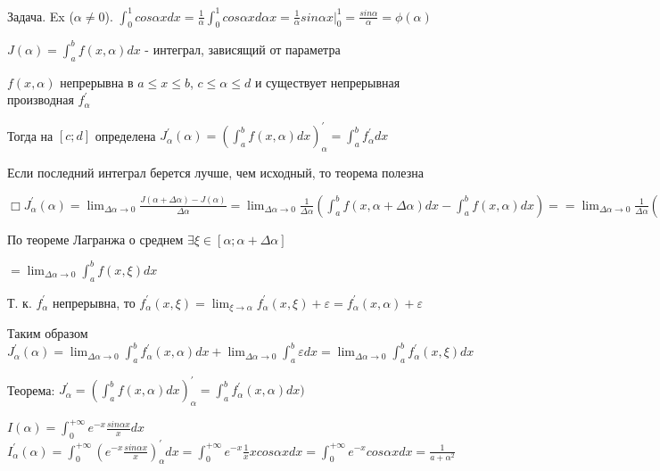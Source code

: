 \documentclass[12pt]{article}
\begin{document}
    Задача. Ex ($\alpha \neq 0$). $\displaystyle \int^{1}_{0} cos\alpha x dx = \frac{1}{\alpha} \int^{1}_{0} cos\alpha x d\alpha x = \frac{1}{\alpha} sin \alpha x \Big|^{1}_{0} = \frac{sin\alpha}{\alpha} = \phi(\alpha)$

    $\displaystyle J(\alpha) = \int^b_a f(x, \alpha)dx$ - интеграл, зависящий от параметра

    $f(x, \alpha)$ непрерывна в $a \leq x \leq b$, $c \leq \alpha \leq d$ и существует непрерывная производная $f^\prime_\alpha$

    Тогда на $[c;d]$ определена $J^\prime_\alpha(\alpha) = \left(\int^b_a f(x, \alpha)dx\right)^\prime_\alpha = \int^b_a f^\prime_\alpha dx$

    Если последний интеграл берется лучше, чем исходный, то теорема полезна

    $\displaystyle \Box J^\prime_\alpha(\alpha) = \lim_{\Delta \alpha \to 0} \frac{J(\alpha + \Delta \alpha) - J(\alpha)}{\Delta \alpha} =
    \lim_{\Delta \alpha \to 0} \frac{1}{\Delta \alpha} (\int^b_a f(x, \alpha + \Delta \alpha)dx - \int^b_a f(x, \alpha)dx) =
    = \lim_{\Delta \alpha \to 0} \frac{1}{\Delta \alpha} (\int^b_a (f(x, \alpha + \Delta \alpha) - f(x, \alpha))dx)$

    По теореме Лагранжа о среднем $\exists \xi \in [\alpha; \alpha + \Delta \alpha]$

    $\displaystyle = \lim_{\Delta \alpha \to 0} \int^b_a f(x, \xi)dx$

    Т. к. $f^\prime_\alpha$ непрерывна, то $\displaystyle f^\prime_\alpha (x, \xi) = \lim_{\xi \to \alpha} f^\prime_\alpha (x, \xi) + \varepsilon = f^\prime_\alpha (x, \alpha) + \varepsilon$

    Таким образом $\displaystyle J^\prime_\alpha(\alpha) = \lim_{\Delta \alpha \to 0} \int^{b}_{a} f^\prime_{\alpha}(x, \alpha) dx + \lim_{\Delta \alpha \to 0} \int^{b}_{a} \varepsilon dx =
    \lim_{\Delta \alpha \to 0} \int^{b}_{a} f^\prime_{\alpha}(x, \xi) dx$



    Теорема: $\displaystyle J^\prime_\alpha = \left(\int^b_a f(x, \alpha)dx\right)^\prime_\alpha = \int^b_a f^\prime_\alpha(x, \alpha)dx)$

    \Ex

    $\displaystyle I(\alpha) = \int^{+\infty}_0 e^{-x} \frac{sin\alpha x}{x}dx$
    $\displaystyle I^\prime_\alpha(\alpha) = \int^{+\infty}_0 (e^{-x} \frac{sin\alpha x}{x})^\prime_\alpha dx = \int^{+\infty}_0 e^{-x} \frac{1}{x} x cos\alpha x dx =
    \int^{+\infty}_0 e^{-x} cos\alpha x dx = \frac{1}{a + \alpha^2}$
\end{document}
